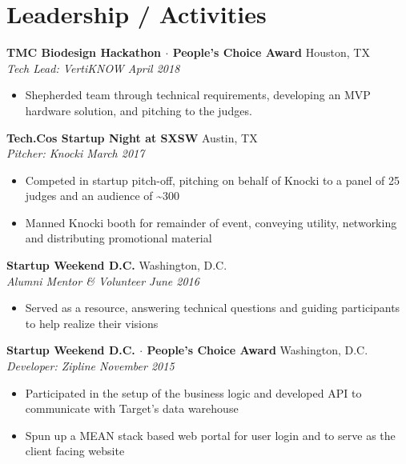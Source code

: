 \documentclass[10pt]{article}
\begin{document}
\section*{Leadership / Activities}
\textbf{TMC Biodesign Hackathon $\cdot$ People's Choice Award} \hfill Houston, TX\\
\textit{Tech Lead: VertiKNOW \hfill April 2018} \\
\vspace{-1.1em}
\begin{itemize}
  \item Shepherded team through technical requirements, developing an MVP hardware solution, and pitching to the judges.
\end{itemize}
\textbf{Tech.Co\textquotesingle{}s Startup Night at SXSW} \hfill Austin, TX\\
\textit{Pitcher: Knocki \hfill March 2017} \\
\vspace{-1.1em}
\begin{itemize}
  \item Competed in startup pitch-off, pitching on behalf of Knocki to a panel of 25 judges and an audience of {\textasciitilde{}}300
  \item Manned Knocki booth for remainder of event, conveying utility, networking and distributing promotional material
\end{itemize}
\textbf{Startup Weekend D.C.} \hfill Washington, D.C. \\
\textit{Alumni Mentor \& Volunteer \hfill June 2016} \\
\vspace{-1.1em}
\begin{itemize}
  \item Served as a resource, answering technical questions and guiding participants to help realize their visions
\end{itemize}
\textbf{Startup Weekend D.C. $\cdot$ People's Choice Award} \hfill Washington, D.C. \\
\textit{Developer: Zipline \hfill November 2015} \\
\vspace{-1.1em}
\begin{itemize}
  \item Participated in the setup of the business logic and developed API to communicate with Target's data warehouse
  \item Spun up a MEAN stack based web portal for user login and to serve as the client facing website
\end{itemize}
\end{document}
